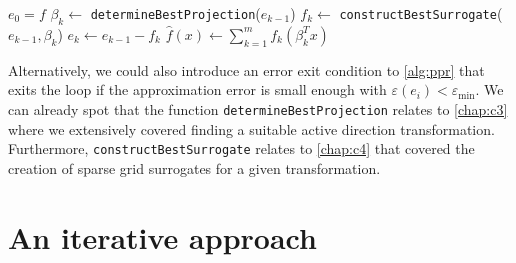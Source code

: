 \documentclass[
  a4paper,  %
  twoside,  %
  bibliography=totoc,
  headsepline,
  cleardoublepage=empty,
  parskip=half,
  draft=false
]{scrbook}
\begin{document}
\begin{mdframed}[style=algstyle,frametitle={\textbf{function} \texttt{projectionPursuitRegression}{$(f, k_{\text{max}})$}}]
\normalsize
\vspace{5.5mm}
\begin{algorithmic}[1]

    \State $e_0 = f$
    	\State $\beta_k \gets$ \texttt{determineBestProjection}($e_{k - 1}$)
    	\State $f_k \gets$ \texttt{constructBestSurrogate}($e_{k - 1}, \beta_k$)
    	\State $e_k \gets e_{k - 1} - f_k$
    \EndFor
    \State $\hat{f}(x) \gets \sum_{k=1}^m f_k(\beta_k^T x)$
    \State {}
\end{algorithmic}

\vspace{-1.5mm}
\delimit

	\label{alg:ppr}
\end{mdframed}
%
Alternatively, we could also introduce an error exit condition to \cref{alg:ppr} that exits the loop if the approximation error is small enough with $\varepsilon(e_i) < \varepsilon_{\mathrm{min}}$.
We can already spot that the function \texttt{determineBestProjection} relates to \cref{chap:c3} where we extensively covered finding a suitable active direction transformation.
Furthermore, \texttt{constructBestSurrogate} relates to \cref{chap:c4} that covered the creation of sparse grid surrogates for a given transformation.

\section{An iterative approach}
\label{sec:it}
\end{document}
